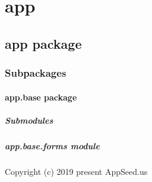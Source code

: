 \documentclass[letterpaper,10pt,french]{sphinxmanual}
\begin{document}
\section{app}
\label{\detokenize{modules:app}}\label{\detokenize{modules::doc}}

\subsection{app package}
\label{\detokenize{app:app-package}}\label{\detokenize{app::doc}}

\subsubsection{Subpackages}
\label{\detokenize{app:subpackages}}

\paragraph{app.base package}
\label{\detokenize{app.base:app-base-package}}\label{\detokenize{app.base::doc}}

\subparagraph{Submodules}
\label{\detokenize{app.base:submodules}}

\subparagraph{app.base.forms module}
\label{\detokenize{app.base:module-app.base.forms}}\label{\detokenize{app.base:app-base-forms-module}}
\sphinxAtStartPar
Copyright (c) 2019 \sphinxhyphen{} present AppSeed.us
\end{document}
